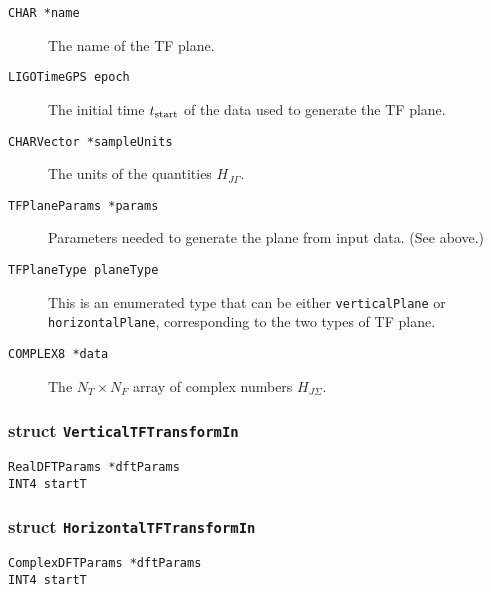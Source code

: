 \begin{description}
\item[\texttt{CHAR  *name}] The name of the TF plane.

\item[\texttt{LIGOTimeGPS   epoch}] The initial time $t_{\rm start}$ of the
data used to generate the TF plane.

\item[\texttt{CHARVector  *sampleUnits}] The units of the quantities $H_{J\Gamma}$.

\item[\texttt{TFPlaneParams   *params}]  Parameters needed to generate the
plane from input data.  (See above.)

\item[\texttt{TFPlaneType   planeType}]  This is an enumerated type that can
be either \verb+verticalPlane+ or \verb+horizontalPlane+, corresponding to the
two types of TF plane. 

\item[\texttt{COMPLEX8   *data}]  The $N_T \times N_F$ array of complex
numbers $H_{J\Sigma}$.

\end{description}

\subsubsection*{struct \texttt{VerticalTFTransformIn}}

\noindent 

\begin{description}
\item[\texttt{RealDFTParams  *dftParams}]
\item[\texttt{INT4  startT}]
\end{description}

\subsubsection*{struct \texttt{HorizontalTFTransformIn}}

\noindent 

\begin{description}
\item[\texttt{ComplexDFTParams  *dftParams}]
\item[\texttt{INT4  startT}]
\end{description}


